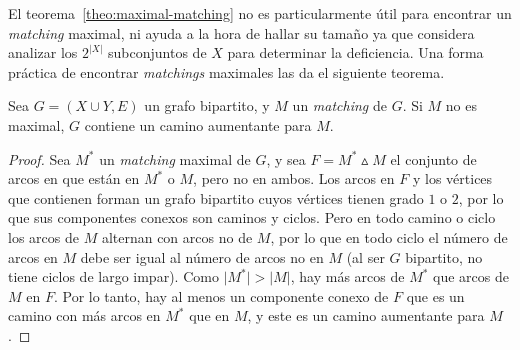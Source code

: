   El teorema~\ref{theo:maximal-matching} no es particularmente útil
  para encontrar
  un \emph{\foreignlanguage{english}{matching}} maximal,
  ni ayuda a la hora de hallar su tamaño
  ya que considera
  analizar los \(2^{\lvert X \rvert}\) subconjuntos de \(X\)
  para determinar la deficiencia.
  Una forma práctica
  de encontrar \emph{\foreignlanguage{english}{matchings}} maximales
  las da el siguiente teorema.
  \begin{theorem}
    \label{theo:matching-augmenting-path}
    Sea \(G = (X \cup Y, E)\) un grafo bipartito,
    y \(M\) un \emph{\foreignlanguage{english}{matching}} de \(G\).
    Si \(M\) no es maximal,
    \(G\) contiene un camino aumentante para \(M\).
  \end{theorem}
  \begin{proof}
    Sea \(M^{*}\)
    un \emph{\foreignlanguage{english}{matching}} maximal de \(G\),
    y sea \(F = M^{*} \vartriangle M\)
    el conjunto de arcos en que están en \(M^{*}\) o \(M\),
    pero no en ambos.
    Los arcos en \(F\) y los vértices que contienen
    forman un grafo bipartito
    cuyos vértices tienen grado \(1\) o \(2\),
    por lo que sus componentes conexos son caminos y ciclos.
    Pero en todo camino o ciclo
    los arcos de \(M\) alternan con arcos no de \(M\),
    por lo que en todo ciclo el número de arcos en \(M\)
    debe ser igual al número de arcos no en \(M\)
    (al ser \(G\) bipartito,
     no tiene ciclos de largo impar).
    Como \(\lvert M^{*} \rvert > \lvert M \rvert\),
    hay más arcos de \(M^{*}\) que arcos de \(M\) en \(F\).
    Por lo tanto,
    hay al menos un componente conexo de \(F\)
    que es un camino con más arcos en \(M^{*}\)
    que en \(M\),
    y este es un camino aumentante para \(M\).
  \end{proof}

